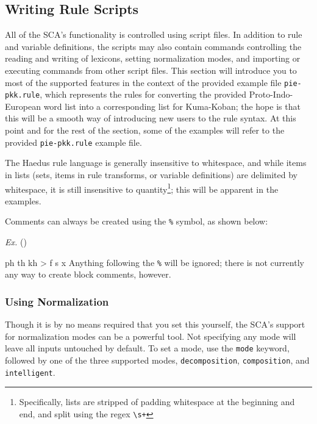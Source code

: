 \documentclass[10pt,letterpaper]{article}
\newcounter{excounter}
\newenvironment{vex}[1]{
	\refstepcounter{excounter}
	\noindent\emph{Ex.} (\arabic{excounter}\label{#1})
	\verbatim
}{\endverbatim}
\begin{document}

\subsection{Writing Rule Scripts}
\label{sub:writing_rule_scripts}
All of the SCA's functionality is controlled using script files. In addition to rule and variable definitions, the scripts may also contain commands controlling the reading and writing of lexicons, setting normalization modes, and importing or executing commands from other script files. This section will introduce you to most of the supported features in the context of the provided example file \texttt{pie-pkk.rule}, which represents the rules for converting the provided Proto-Indo-European word list into a corresponding list for Kuma-Koban; the hope is that this will be a smooth way of introducing new users to the rule syntax. At this point and for the rest of the section, some of the examples will refer to the provided \texttt{pie-pkk.rule} example file.

The Haedus rule language is generally insensitive to whitespace, and while items in lists (sets, items in rule transforms, or variable definitions) are delimited by whitespace, it is still insensitive to quantity\footnote{Specifically, lists are stripped of padding whitespace at the beginning and end, and split using the regex \texttt{\textbackslash\hspace{0pt}s+}}; this will be apparent in the examples. 

Comments can always be created using the \texttt{\%} symbol, as shown below:

\begin{vex}{ex:comment}
ph th kh > f s x %
\end{vex}
\noindent
Anything following the \texttt{\%} will be ignored; there is not currently any way to create block comments, however. 


\subsubsection{Using Normalization} 
\label{ssub:using_normalization}
Though it is by no means required that you set this yourself, the SCA's support for normalization modes can be a powerful tool. Not specifying any mode will leave all inputs untouched by default. To set a mode, use the \texttt{mode} keyword, followed by one of the three supported modes, \texttt{decomposition}, \texttt{composition}, and \texttt{intelligent}.
\end{document}
